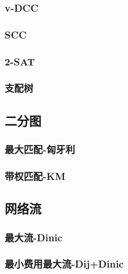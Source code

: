 \documentclass[twocolumn,a4]{article}
\newcommand{\addcpp}[1]{}
\begin{document}
		\subsubsection{v-DCC}
		\subsubsection{SCC}
		\subsubsection{2-SAT}
		\subsubsection{支配树}
	\subsection{二分图}
		\subsubsection{最大匹配-匈牙利}		
		\subsubsection{带权匹配-KM}
	\subsection{网络流}
		\subsubsection{最大流-Dinic}
			\addcpp{graph/MF_dinic}
		\subsubsection{最小费用最大流-Dij+Dinic}
			\addcpp{graph/MSMF_dij_dinic}
\end{document}
